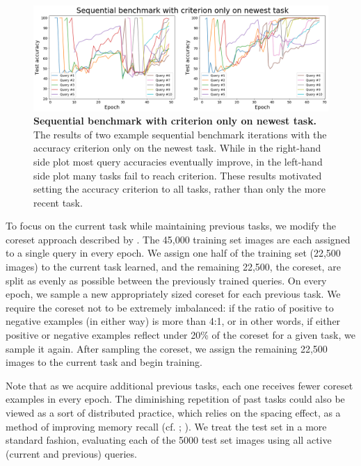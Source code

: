 \begin{figure}[!htb]
\centering
\includegraphics[width=\linewidth]{ch-dataset-task-benchmark/figures/benchmark/old_benchmark.png}
\caption{{\bf Sequential benchmark with criterion only on newest task.} The results of two example sequential benchmark iterations with the accuracy criterion only on the newest task. While in the right-hand side plot most query accuracies eventually improve, in the left-hand side plot many tasks fail to reach criterion. These results motivated setting the accuracy criterion to all tasks, rather than only the more recent task.}
\label{fig:old-sequential-benchmark}
\end{figure}

To focus on the current task while maintaining previous tasks, we modify the coreset approach described by \textcite{Nguyen2018}. The 45,000 training set images are each assigned to a single query in every epoch. We assign one half of the training set (22,500 images) to the current task learned, and the remaining 22,500, the coreset, are split as evenly as possible between the previously trained queries. On every epoch, we sample a new appropriately sized coreset for each previous task. We require the coreset not to be extremely imbalanced: if the ratio of positive to negative examples (in either way) is more than 4:1, or in other words, if either positive or negative examples reflect under 20\% of the coreset for a given task, we sample it again. After sampling the coreset, we assign the remaining 22,500 images to the current task and begin training. 

Note that as we acquire additional previous tasks, each one receives fewer coreset examples in every epoch. The diminishing repetition of past tasks could also be viewed as a sort of distributed practice, which relies on the spacing effect, as a method of improving memory recall (cf. \cite{Bahrick1993}; \cite{Russo1998}). We treat the test set in a more standard fashion, evaluating each of the 5000 test set images using all active (current and previous) queries.

